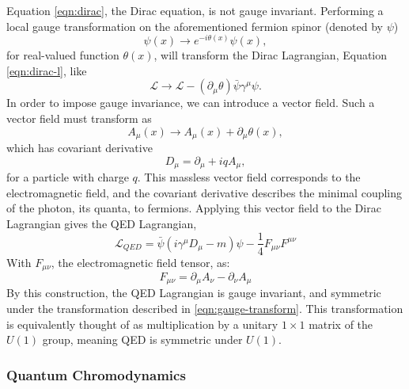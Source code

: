         Equation \ref{eqn:dirac}, the Dirac equation, is not gauge invariant. Performing a local gauge transformation on the aforementioned fermion spinor (denoted by $\psi$)
        \begin{equation} \label{eqn:gauge-transform}
            \psi(x) \rightarrow e^{-i\theta(x)}\psi(x),
        \end{equation}        
        for real-valued function $\theta(x)$, will transform the Dirac Lagrangian, Equation \ref{eqn:dirac-l}, like
        \begin{equation}
            \mathcal{L} \rightarrow \mathcal{L} - (\partial_{\mu}\theta)\bar{\psi}\gamma^{\mu}\psi.
        \end{equation}
        In order to impose gauge invariance, we can introduce a vector field. Such a vector field must transform as
        \begin{equation}
            A_{\mu}(x) \rightarrow A_{\mu}(x) + \partial_{\mu}\theta(x),
        \end{equation}
        which has covariant derivative
        \begin{equation}
            D_{\mu} = \partial_{\mu} + iqA_{\mu},
        \end{equation}
        for a particle with charge $q$. This massless vector field corresponds to the electromagnetic field, and the covariant derivative describes the minimal coupling of the photon, its quanta, to fermions. Applying this vector field to the Dirac Lagrangian gives the \gls{QED} Lagrangian,
        \begin{equation}\label{eqn:qed-lagrangian}
            \mathcal{L}_{QED} = \bar{\psi} (i \gamma^{\mu} D_{\mu} - m)\psi - \frac{1}{4} F_{\mu \nu}F^{\mu \nu}
        \end{equation}
        With $F_{\mu \nu}$, the electromagnetic field tensor, as:
        \begin{equation}\label{eqn:em-field-tensor}
        F_{\mu \nu} = \partial_{\mu}A_{\nu} - \partial_{\nu}A_{\mu}
        \end{equation}
        By this construction, the \gls{QED} Lagrangian is gauge invariant, and symmetric under the transformation described in \ref{eqn:gauge-transform}. This transformation is equivalently thought of as multiplication by a unitary $1 \times 1$ matrix of the $U(1)$ group, meaning \gls{QED} is symmetric under $U(1)$.


        \subsubsection{Quantum Chromodynamics} \label{sssec:QCD}

